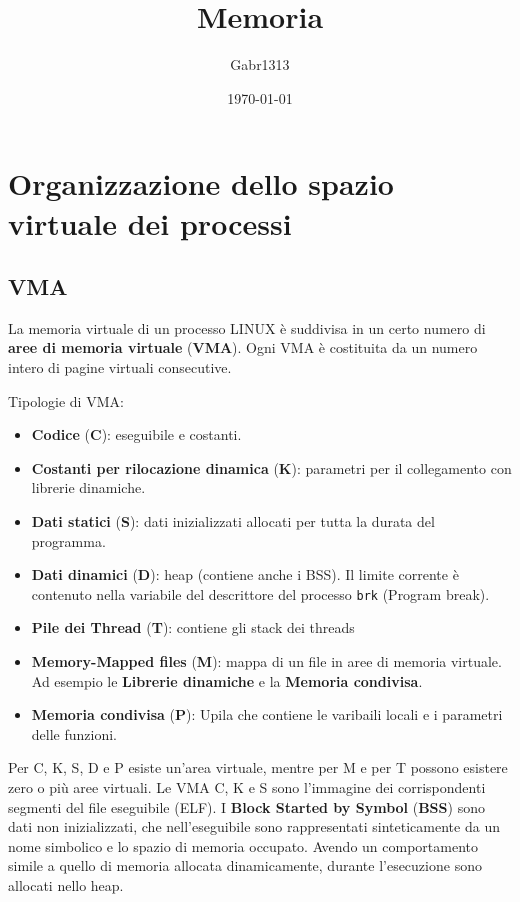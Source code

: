 \documentclass[12pt, a4paper]{report}
\title{Memoria}
\author{Gabr1313}
\date{\today}
\begin{document}
\justify
\sloppy
\maketitle
\tableofcontents

\chapter{Organizzazione dello spazio virtuale dei processi}
\section{VMA}
La memoria virtuale di un processo LINUX è suddivisa in un certo numero di
\textbf{aree di memoria virtuale} (\textbf{VMA}). Ogni VMA è costituita da un
numero intero di pagine virtuali consecutive.

Tipologie di VMA:
\begin{itemize}
	\item \textbf{Codice} (\textbf{C}): eseguibile e costanti.
	\item \textbf{Costanti per rilocazione dinamica} (\textbf{K}): parametri per
		il collegamento con librerie dinamiche.
	\item \textbf{Dati statici} (\textbf{S}): dati inizializzati allocati per
		tutta la durata del programma.
	\item \textbf{Dati dinamici} (\textbf{D}): heap (contiene anche i BSS). Il
		limite corrente è contenuto nella variabile del descrittore del
		processo \texttt{brk} (Program break).
	\item \textbf{Pile dei Thread} (\textbf{T}): contiene gli stack dei threads
	\item \textbf{Memory-Mapped files} (\textbf{M}): mappa di un file in aree di
		memoria virtuale. Ad esempio le \textbf{Librerie dinamiche} e la
		\textbf{Memoria condivisa}.
	\item \textbf{Memoria condivisa} (\textbf{P}): Upila che contiene le
		varibaili locali e i parametri delle funzioni.
\end{itemize}
Per C, K, S, D e P esiste un'area virtuale, mentre per M e per T possono
esistere zero o più aree virtuali. Le VMA C, K e S sono l'immagine dei
corrispondenti segmenti del file eseguibile (ELF). I \textbf{Block Started by
Symbol} (\textbf{BSS}) sono dati non inizializzati, che nell'eseguibile sono
rappresentati sinteticamente da un nome simbolico e lo spazio di memoria
occupato. Avendo un comportamento simile a quello di memoria allocata
dinamicamente, durante l'esecuzione sono allocati nello heap.
\end{document}
